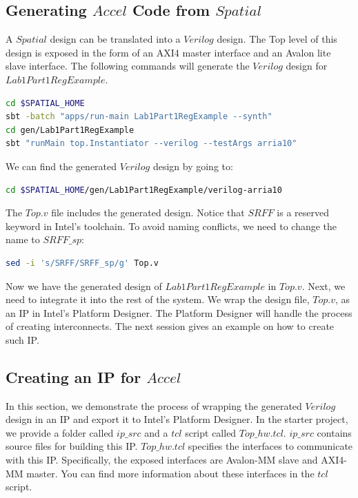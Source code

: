 \documentclass{article}
\begin{document}
\subsection{Generating $Accel$ Code from $Spatial$}
A $Spatial$ design can be translated into a $Verilog$ design.
The Top level of this design is exposed in the form of an AXI4 master interface and an Avalon lite slave interface.
The following commands will generate the $Verilog$ design for $Lab1Part1RegExample$.
\begin{lstlisting}[language=bash]
cd $SPATIAL_HOME
sbt -batch "apps/run-main Lab1Part1RegExample --synth"
cd gen/Lab1Part1RegExample
sbt "runMain top.Instantiator --verilog --testArgs arria10"
\end{lstlisting}

We can find the generated $Verilog$ design by going to:
\begin{lstlisting}[language=bash]
cd $SPATIAL_HOME/gen/Lab1Part1RegExample/verilog-arria10
\end{lstlisting}

The $Top.v$ file includes the generated design.
Notice that $SRFF$ is a reserved keyword in Intel's toolchain.
To avoid naming conflicts, we need to change the name to $SRFF\_sp$:
\begin{lstlisting}[language=bash]
sed -i 's/SRFF/SRFF_sp/g' Top.v
\end{lstlisting}

Now we have the generated design of $Lab1Part1RegExample$ in $Top.v$.
Next, we need to integrate it into the rest of the system.
We wrap the design file, $Top.v$, as an IP in Intel's Platform Designer.
The Platform Designer will handle the process of creating interconnects.
The next session gives an example on how to create such IP.

\subsection{Creating an IP for $Accel$}
In this section, we demonstrate the process of wrapping the generated $Verilog$ design
    in an IP and export it to Intel's Platform Designer.
In the starter project, we provide a folder called $ip\_src$ and a $tcl$ script called $Top\_hw.tcl$.
$ip\_src$ contains source files for building this IP.
$Top\_hw.tcl$ specifies the interfaces to communicate with this IP.
Specifically, the exposed interfaces are Avalon-MM slave and AXI4-MM master.
You can find more information about these interfaces in the $tcl$ script.
\end{document}
